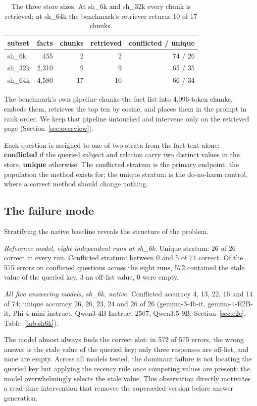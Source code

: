 \documentclass[journal=jcisd8,manuscript=article]{achemso}
\begin{document}
\begin{table}[H]\centering
\caption{The three store sizes. At sh\_6k and sh\_32k every chunk is retrieved; at sh\_64k the benchmark's retriever returns 10 of 17 chunks.}
\begin{tabular}{lrrrr}\toprule
subset & facts & chunks & retrieved & conflicted / unique \\\midrule
sh\_6k & 455 & 2 & 2 & 74 / 26\\
sh\_32k & 2,310 & 9 & 9 & 65 / 35\\
sh\_64k & 4,580 & 17 & 10 & 66 / 34\\\bottomrule
\end{tabular}\label{tab:stores}\end{table}

The benchmark's own pipeline chunks the fact list into 4,096-token chunks, embeds them, retrieves the top ten by cosine, and places them in the prompt in rank order. We keep that pipeline untouched and intervene only on the retrieved page (Section~\ref{sec:overview}).

Each question is assigned to one of two strata from the fact text alone: \textbf{conflicted} if the queried subject and relation carry two distinct values in the store, \textbf{unique} otherwise. The conflicted stratum is the primary endpoint, the population the method exists for; the unique stratum is the do-no-harm control, where a correct method should change nothing.

\subsection{The failure mode}
\label{sec:failure}

Stratifying the native baseline reveals the structure of the problem.

\emph{Reference model, eight independent runs at sh\_6k.} Unique stratum: 26 of 26 correct in every run. Conflicted stratum: between 0 and 5 of 74 correct. Of the 575 errors on conflicted questions across the eight runs, 572 contained the stale value of the queried key, 3 an off-list value, 0 were empty.

\emph{All five answering models, sh\_6k, native.} Conflicted accuracy 4, 13, 22, 16 and 14 of 74; unique accuracy 26, 26, 23, 24 and 26 of 26 (gemma-3-4b-it, gemma-4-E2B-it, Phi-4-mini-instruct, Qwen3-4B-Instruct-2507, Qwen3.5-9B; Section~\ref{sec:e2e}, Table~\ref{tab:sh6k}).

The model almost always finds the correct slot: in 572 of 575 errors, the wrong answer is the stale value of the queried key; only three responses are off-list, and none are empty. Across all models tested, the dominant failure is not locating the queried key but applying the recency rule once competing values are present: the model overwhelmingly selects the stale value. This observation directly motivates a read-time intervention that removes the superseded version before answer generation.
\end{document}
